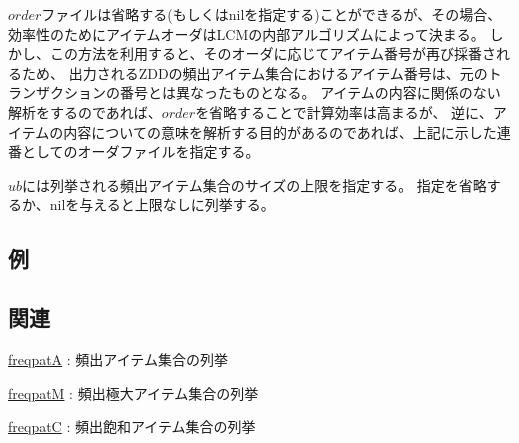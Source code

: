 $order$ファイルは省略する(もしくはnilを指定する)ことができるが、その場合、
効率性のためにアイテムオーダはLCMの内部アルゴリズムによって決まる。
しかし、この方法を利用すると、そのオーダに応じてアイテム番号が再び採番されるため、
出力されるZDDの頻出アイテム集合におけるアイテム番号は、元のトランザクションの番号とは異なったものとなる。
アイテムの内容に関係のない解析をするのであれば、$order$を省略することで計算効率は高まるが、
逆に、アイテムの内容についての意味を解析する目的があるのであれば、上記に示した連番としてのオーダファイルを指定する。

$ub$には列挙される頻出アイテム集合のサイズの上限を指定する。
指定を省略するか、nilを与えると上限なしに列挙する。

\subsection*{例}


\subsection*{関連}
\hyperref[sect:freqpatA]{freqpatA} : 頻出アイテム集合の列挙

\hyperref[sect:freqpatM]{freqpatM} : 頻出極大アイテム集合の列挙

\hyperref[sect:freqpatC]{freqpatC} : 頻出飽和アイテム集合の列挙


